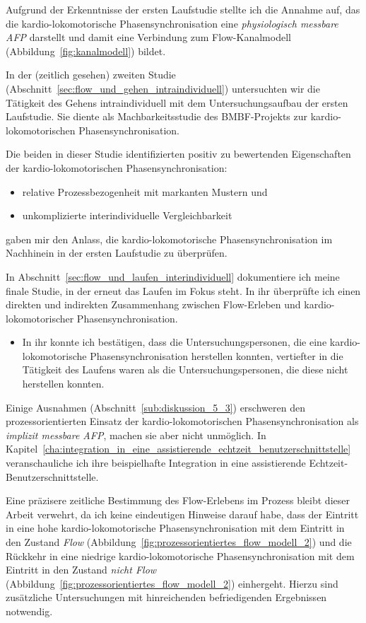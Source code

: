 Aufgrund der Erkenntnisse der ersten Laufstudie stellte ich die Annahme auf, das die kardio-lokomotorische Phasensynchronisation eine \emph{physiologisch messbare \ac{AFP}} darstellt und damit eine Verbindung zum Flow-Kanalmodell (Abbildung~\ref{fig:kanalmodell}) bildet.

In der (zeitlich gesehen) zweiten Studie (Abschnitt~\ref{sec:flow_und_gehen_intraindividuell}) untersuchten wir die Tätigkeit des Gehens intraindividuell mit dem Untersuchungsaufbau der ersten Laufstudie. Sie diente als Machbarkeitsstudie des \acs{BMBF}-Projekts zur kardio-lokomotorischen Phasensynchronisation. 

Die beiden in dieser Studie identifizierten positiv zu bewertenden Eigenschaften der kardio-lokomotorischen Phasensynchronisation: 
\begin{itemize}
	
	\item relative Prozessbezogenheit mit markanten Mustern und
	
	\item unkomplizierte interindividuelle Vergleichbarkeit 
\end{itemize}

gaben mir den Anlass, die kardio-lokomotorische Phasensynchronisation im Nachhinein in der ersten Laufstudie zu überprüfen. 

In Abschnitt~\ref{sec:flow_und_laufen_interindividuell} dokumentiere ich meine finale Studie, in der erneut das Laufen im Fokus steht. In ihr überprüfte ich einen direkten und indirekten Zusammenhang zwischen Flow-Erleben und kardio-lokomotorischer Phasensynchronisation. 
\begin{itemize}
	
	\item In ihr konnte ich bestätigen, dass die Untersuchungspersonen, die eine kardio-lokomotorische Phasensynchronisation herstellen konnten, vertiefter in die Tätigkeit des Laufens waren als die Untersuchungspersonen, die diese nicht herstellen konnten. 
\end{itemize}

Einige Ausnahmen (Abschnitt~\ref{sub:diskussion_5_3}) erschweren den prozessorientierten Einsatz der kardio-lokomotorischen Phasensynchronisation als \emph{implizit messbare \ac{AFP}}, machen sie aber nicht unmöglich. In Kapitel~\ref{cha:integration_in_eine_assistierende_echtzeit_benutzerschnittstelle} veranschauliche ich ihre beispielhafte Integration in eine assistierende Echtzeit-Benutzerschnittstelle.

Eine präzisere zeitliche Bestimmung des Flow-Erlebens im Prozess bleibt dieser Arbeit verwehrt, da ich keine eindeutigen Hinweise darauf habe, dass der Eintritt in eine hohe kardio-lokomotorische Phasensynchronisation mit dem Eintritt in den Zustand \emph{Flow} (Abbildung~\ref{fig:prozessorientiertes_flow_modell_2}) und die Rückkehr in eine niedrige kardio-lokomotorische Phasensynchronisation mit dem Eintritt in den Zustand \emph{nicht Flow} (Abbildung~\ref{fig:prozessorientiertes_flow_modell_2}) einhergeht. Hierzu sind zusätzliche Untersuchungen mit hinreichenden befriedigenden Ergebnissen notwendig. 
